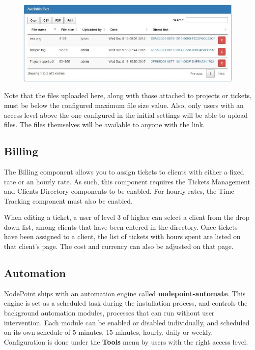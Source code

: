 \documentclass[11pt]{article}
\begin{document}
\begin{figure}[h]
\includegraphics{files.jpg}
\end{figure}

Note that the files uploaded here, along with those attached to projects or tickets, must be below the configured maximum file size value. Also, only users with an access level above the one configured in the initial settings will be able to upload files. The files themselves will be available to anyone with the link.

\subsection{Billing}
The Billing component allows you to assign tickets to clients with either a fixed rate or an hourly rate. As such, this component requires the Tickets Management and Clients Directory components to be enabled. For hourly rates, the Time Tracking component must also be enabled.

When editing a ticket, a user of level 3 of higher can select a client from the drop down list, among clients that have been entered in the directory. Once tickets have been assigned to a client, the list of tickets with hours spent are listed on that client's page. The cost and currency can also be adjusted on that page.

\subsection{Automation}
NodePoint ships with an automation engine called \textbf{nodepoint-automate}. This engine is set as a scheduled task during the installation process, and controls the background automation modules, processes that can run without user intervention. Each module can be enabled or disabled individually, and scheduled on its own schedule of 5 minutes, 15 minutes, hourly, daily or weekly. Configuration is done under the \textbf{Tools} menu by users with the right access level.
\end{document}
